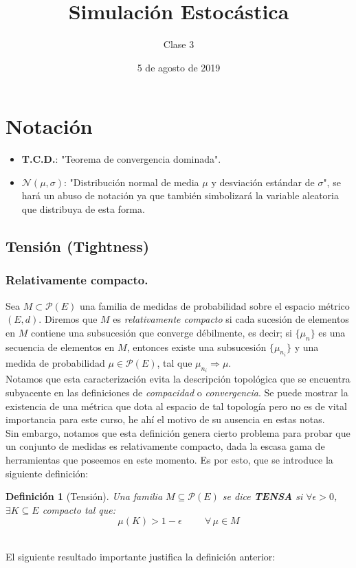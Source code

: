 \documentclass[a4paper]{article}
\title{Simulación Estocástica}
\author{Clase 3}
\date{5 de agosto de 2019}
\newtheorem{definicion}{Definición}
\numberwithin{equation}{subsection}
\begin{document}
\maketitle

\section{Notación}
\begin{itemize}
    \item \textbf{T.C.D.}: "Teorema de convergencia  dominada".
    \item $\mathcal{N}(\mu,\sigma)$: "Distribución normal de media $\mu$ y desviación estándar de $\sigma$", se hará un abuso de notación ya que también simbolizará la variable aleatoria que distribuya de esta forma.
\end{itemize}

\subsection{Tensión (Tightness)}
\subsubsection{Relativamente compacto.}
Sea $M\subset \mathcal{P}(E)$ una familia de medidas de probabilidad sobre el espacio métrico $(E,d)$. Diremos que $M$ es \textit{relativamente compacto} si cada sucesión de elementos en $M$ contiene una subsucesión que converge débilmente, es decir; si $\{\mu_n\}$ es una secuencia de elementos en $M$, entonces existe una subsucesión $\{\mu_{n_i}\}$ y una medida de probabilidad $\mu \in \mathcal{P}(E)$, tal que $\mu_{n_i} \Rightarrow \mu$.  \\ \newline
Notamos que esta caracterización evita la descripción topológica que se encuentra subyacente en las definiciones de \textit{compacidad} o \textit{convergencia}. Se puede mostrar la existencia de una métrica que dota al espacio de tal topología pero no es de vital importancia para este curso, he ahí el motivo de su ausencia en estas notas. \\ \newline
Sin embargo, notamos que esta definición genera cierto problema para probar que un conjunto de medidas es relativamente compacto, dada la escasa gama de herramientas que poseemos en este momento. Es por esto, que se introduce la siguiente definición:

\begin{definicion}[Tensión] Una familia $M\subseteq \mathcal{P}(E)$ se dice \textbf{TENSA} si $\forall \epsilon > 0$, $\exists K\subseteq E$ compacto tal que:
\[\mu(K) > 1-\epsilon \hspace{1cm}\forall\,\mu\in M\]
\end{definicion}
\\ \newline
El siguiente resultado importante justifica la definición anterior:
\end{document}
